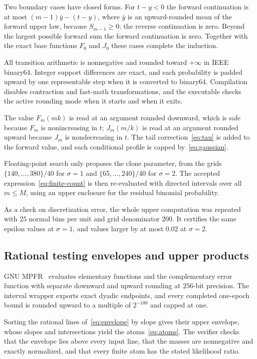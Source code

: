 \documentclass[conference]{IEEEtran}
\begin{document}
Two boundary cases have closed forms. For $t-y<0$ the forward continuation is at most $(m-1)\bar y-(t-y)$, where $\bar y$ is an upward-rounded mean of the forward upper law, because $S_{m-1}\ge0$; the reverse continuation is zero. Beyond the largest possible forward sum the forward continuation is zero. Together with the exact base functions $F_0$ and $J_0$ these cases complete the induction.

All transition arithmetic is nonnegative and rounded toward $+\infty$ in IEEE binary64. Integer support differences are exact, and each probability is padded upward by one representable step when it is converted to binary64. Compilation disables contraction and fast-math transformations, and the executable checks the active rounding mode when it starts and when it exits.

The value $F_m(mk)$ is read at an argument rounded downward, which is safe because $F_m$ is nonincreasing in $t$; $J_m(m/k)$ is read at an argument rounded upward because $J_m$ is nondecreasing in $t$. The tail correction~\eqref{eq:tau} is added to the forward value, and each conditional profile is capped by~\eqref{eq:gaussian}.

Floating-point search only proposes the clone parameter, from the grids $\{140,\ldots,380\}/40$ for $\sigma=1$ and $\{65,\ldots,240\}/40$ for $\sigma=2$. The accepted expression~\eqref{eq:finite-count} is then re-evaluated with directed intervals over all $m\le M$, using an upper enclosure for the residual binomial probability.

As a check on discretization error, the whole upper computation was repeated with $25$ normal bins per unit and grid denominator $200$. It certifies the same epsilon values at $\sigma=1$, and values larger by at most $0.02$ at $\sigma=2$.

\subsection{Rational testing envelopes and upper products}
GNU MPFR~\cite{mpfr} evaluates elementary functions and the complementary error function with separate downward and upward rounding at $256$-bit precision. The interval wrapper exports exact dyadic endpoints, and every completed one-epoch bound is rounded upward to a multiple of $2^{-100}$ and capped at one.

Sorting the rational lines of~\eqref{eq:envelope} by slope gives their upper envelope, whose slopes and intersections yield the atoms~\eqref{eq:atoms}. The verifier checks that the envelope lies above every input line, that the masses are nonnegative and exactly normalized, and that every finite atom has the stated likelihood ratio.
\end{document}
